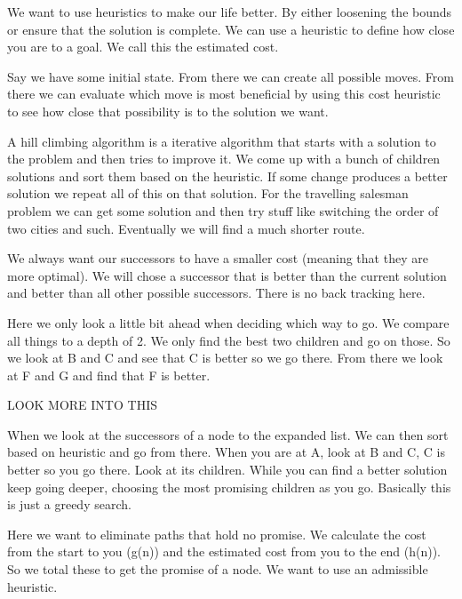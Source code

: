 \documentclass[12pt]{article}
\begin{document}

We  want to use heuristics to make our life better. By either loosening the bounds or ensure that the solution is complete. We can use a heuristic to define how close you are to a goal. We call this the estimated cost. 


Say we have some initial state. From there we can create all possible moves. From there we can evaluate which move is most beneficial by using this cost heuristic to see how close that possibility is to the solution we want. 


A hill climbing algorithm is a iterative algorithm that starts with a solution to the problem and then tries to improve it. We come up with a bunch of children solutions and sort them based on the heuristic. If some change produces a better solution we repeat all of this on that solution. For the travelling salesman problem we can get some solution and then try stuff like switching the order of two cities and such. Eventually we will find a much shorter route.


We always want our successors to have a smaller cost (meaning that they are more optimal). We will chose a successor that is better than the current solution and better than all other possible successors. There is no back tracking here. 


Here we only look a little bit ahead when deciding which way to go. We compare all things to a depth of 2. We only find the best two children and go on those. So we look at B and C and see that C is better so we go there. From there we look at F and G and find that F is better. 

LOOK MORE INTO THIS


When we look at the successors of a node to the expanded list. We can then sort based on heuristic and go from there. When you are at A, look at B and C, C is better so you go there. Look at its children. While you can find a better solution keep going deeper, choosing the most promising children as you go. Basically this is just a greedy search. 


Here we want to eliminate paths that hold no promise. We calculate the cost from the start to you (g(n)) and the estimated cost from you to the end (h(n)). So we total these to get the promise of a node. We want to use an admissible heuristic.
\end{document}
